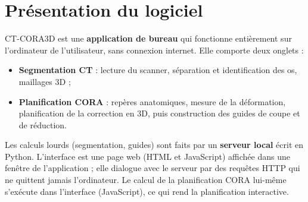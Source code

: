 \documentclass[11pt,a4paper]{article}
\begin{document}
\section{Présentation du logiciel}

CT-CORA3D est une \textbf{application de bureau} qui fonctionne entièrement sur l'ordinateur de l'utilisateur, sans
connexion internet. Elle comporte deux onglets :
\begin{itemize}
  \item \textbf{Segmentation CT} : lecture du scanner, séparation et identification des os, maillages 3D ;
  \item \textbf{Planification CORA} : repères anatomiques, mesure de la déformation, planification de la correction
        en 3D, puis construction des guides de coupe et de réduction.
\end{itemize}

Les calculs lourds (segmentation, guides) sont faits par un \textbf{serveur local} écrit en Python. L'interface est une
page web (HTML et JavaScript) affichée dans une fenêtre de l'application ; elle dialogue avec le serveur par des
requêtes HTTP qui ne quittent jamais l'ordinateur. Le calcul de la planification CORA lui-même s'exécute dans
l'interface (JavaScript), ce qui rend la planification interactive.
\end{document}
